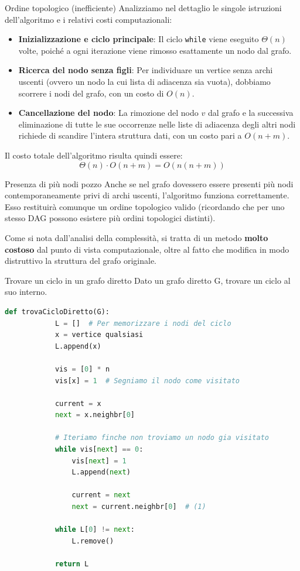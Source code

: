 \documentclass[12pt]{report}
\begin{document}
	\begin{algoritmo}{Ordine topologico (inefficiente)}{}
		Analizziamo nel dettaglio le singole istruzioni dell'algoritmo e i relativi costi computazionali:
		\begin{itemize}
			\item \textbf{Inizializzazione e ciclo principale}: Il ciclo \texttt{while} viene eseguito $\Theta(n)$ volte, poiché a ogni iterazione viene rimosso esattamente un nodo dal grafo.
			
			\item \textbf{Ricerca del nodo senza figli}: Per individuare un vertice senza archi uscenti (ovvero un nodo la cui lista di adiacenza sia vuota), dobbiamo scorrere i nodi del grafo, con un costo di $O(n)$.
			
			\item \textbf{Cancellazione del nodo}: La rimozione del nodo $v$ dal grafo e la successiva eliminazione di tutte le sue occorrenze nelle liste di adiacenza degli altri nodi richiede di scandire l'intera struttura dati, con un costo pari a $O(n + m)$.
		\end{itemize}
		
		Il costo totale dell'algoritmo risulta quindi essere:
		\[
		\Theta(n) \cdot O(n + m) = O(n(n + m))
		\]
	\end{algoritmo}
	
	\begin{osservazione}{Presenza di più nodi pozzo}{}
		Anche se nel grafo dovessero essere presenti più nodi contemporaneamente privi di archi uscenti, l'algoritmo funziona correttamente. Esso restituirà comunque un ordine topologico valido (ricordando che per uno stesso DAG possono esistere più ordini topologici distinti).
	\end{osservazione}
	
	Come si nota dall'analisi della complessità, si tratta di un metodo \textbf{molto costoso} dal punto di vista computazionale, oltre al fatto che modifica in modo distruttivo la struttura del grafo originale.
	
	\begin{esercizio}{Trovare un ciclo in un grafo diretto}{}
		Dato un grafo diretto G, trovare un ciclo al suo interno.
	\end{esercizio}
	
	\newpage
	\begin{lstlisting}[style=stile-listings, language=Python, caption={Algoritmo per la ricerca di un ciclo diretto}]
		def trovaCicloDiretto(G):
			L = []  # Per memorizzare i nodi del ciclo
			x = vertice qualsiasi
			L.append(x)
			
			vis = [0] * n
			vis[x] = 1  # Segniamo il nodo come visitato
			
			current = x
			next = x.neighbr[0]
			
			# Iteriamo finche non troviamo un nodo gia visitato
			while vis[next] == 0:
				vis[next] = 1
				L.append(next)
				
				current = next
				next = current.neighbr[0]  # (1)
				
			while L[0] != next:
				L.remove()
			
			return L
	\end{lstlisting}
	
\end{document}
